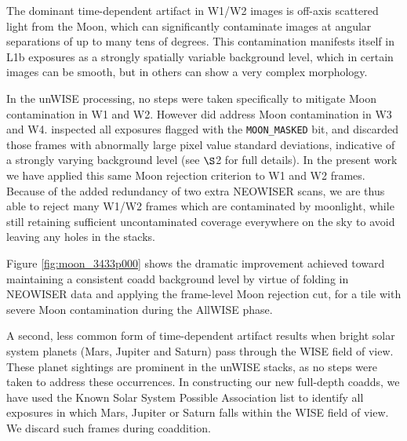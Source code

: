 \documentclass{emulateapj}
\begin{document}
The dominant time-dependent artifact in W1/W2 images is off-axis
scattered light from the Moon, which can significantly contaminate
images at angular separations of up to many tens of degrees. This
contamination manifests itself in L1b exposures as a strongly spatially 
variable background level, which in certain images can be smooth, but in
others can show a very complex morphology.

In the \cite{lang14} unWISE processing, no steps were taken specifically
to mitigate Moon contamination in W1 and W2. However \cite{lang14} did 
address Moon contamination in W3 and W4. \cite{lang14}
inspected all exposures flagged with the \verb|MOON_MASKED| bit, and 
discarded those frames with abnormally large pixel value standard deviations,
indicative of a strongly varying background level (see \cite{lang14} $\S$2
for full details). In the present work we have applied this same
Moon rejection criterion to W1 and W2 frames. Because of the added redundancy
of two extra NEOWISER scans, we are thus able to reject many W1/W2
frames which are contaminated by moonlight, while still retaining 
sufficient uncontaminated coverage everywhere on the sky to avoid leaving
any holes in the stacks.

Figure \ref{fig:moon_3433p000} shows the dramatic improvement achieved toward 
maintaining a consistent coadd background level by virtue of folding in 
NEOWISER data and applying the frame-level Moon rejection cut, for a tile with 
severe Moon contamination during the AllWISE phase.

\begin{figure*}
 \begin{center}
  \caption{\label{fig:moon_3433p000} Tile 3433p000, a 
           1.5$^{\circ}$$\times$1.5$^{\circ}$ region of sky at low
           ecliptic latitude which experienced strong Moon contamination 
           during the AllWISE mission phase. Rejecting Moon-contaminated
           frames as described in \ref{sec:moon} while including
           two extra visits worth of NEOWISER data has dramatically
           improved the background level uniformity relative to the
           \cite{lang14} version of this tile. For this tile, we were
           able to recover 58\% (18\%) of frames in W1 (W2).}
 \end{center}
\end{figure*}

A second, less common form of time-dependent artifact results when
bright solar system planets (Mars, Jupiter and Saturn) pass through
the WISE field of view. These planet sightings are prominent in the 
\cite{lang14} unWISE stacks, as no steps were taken to address these
occurrences. In constructing our new full-depth coadds, we have used the Known 
Solar System Possible Association list to identify all exposures in which
Mars, Jupiter or Saturn falls within the WISE field of view. We discard
such frames during coaddition. 
\end{document}
